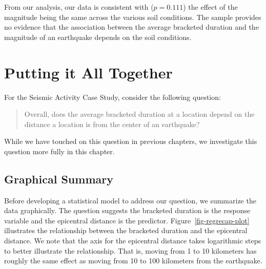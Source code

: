 \documentclass[
  letterpaper,
  DIV=11,
  numbers=noendperiod]{scrreprt}
\theoremstyle{definition}
\theoremstyle{definition}
\theoremstyle{plain}
\theoremstyle{remark}
\begin{document}
\begin{table}

\caption{\label{tbl-regextensions-anova}Table partitioning the sources
of variability corresponding to testing whether the effect of the
magnitude of an earthquake on the resulting bracketed duration differs
across soil conditions.}


\end{table}%

From our analysis, our data is consistent with (\(p = 0.111\)) the
effect of the magnitude being the same across the various soil
conditions. The sample provides no evidence that the association between
the average bracketed duration and the magnitude of an earthquake
depends on the soil conditions.

\chapter{Putting it All Together}\label{sec-regrecap}

For the Seismic Activity Case Study, consider the following question:

\begin{quote}
Overall, does the average bracketed duration at a location depend on the
distance a location is from the center of an earthquake?
\end{quote}

While we have touched on this question in previous chapters, we
investigate this question more fully in this chapter.

\section{Graphical Summary}\label{graphical-summary}

Before developing a statistical model to address our question, we
summarize the data graphically. The question suggests the bracketed
duration is the response variable and the epicentral distance is the
predictor. Figure~\ref{fig-regrecap-plot} illustrates the relationship
between the bracketed duration and the epicentral distance. We note that
the axis for the epicentral distance takes logarithmic steps to better
illustrate the relationship. That is, moving from 1 to 10 kilometers has
roughly the same effect as moving from 10 to 100 kilometers from the
earthquake.
\end{document}
